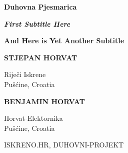 \documentclass[twoside,12pt]{article}
\begin{document}
\begin{titlepage}			%
\begin{center}				%

{\fontsize{16mm}{25mm}\selectfont
	\textbf{Duhovna Pjesmarica}
	}

\vspace{40mm}				%

{\fontsize{14pt}{14pt}\selectfont
	\textbf{\emph{First Subtitle Here}}
	}
	
\vspace{7pt}				%

{\fontsize{14pt}{14pt}\selectfont
	\textbf{And Here is Yet Another Subtitle}
	}
	
\vfill						%

\begin{multicols}{2}		%

{\fontsize{18pt}{18pt}\selectfont
	\textbf{\MakeUppercase{Stjepan Horvat}}
	}

\vspace{5mm}				%

Riječi Iskrene\\
Pušćine, Croatia

\columnbreak				%

{\fontsize{18pt}{18pt}\selectfont
	\textbf{\MakeUppercase{Benjamin Horvat}}
	}

\vspace{5mm}				%

Horvat-Elektornika\\
Pušćine, Croatia
\end{multicols}				%

\vspace{10mm}				%


{\small
\MakeUppercase{iskreno.hr, Duhovni-Projekt}
}\end{center}
\end{titlepage}

\tableofcontents
\end{document}
